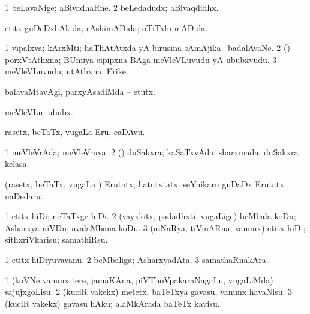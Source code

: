 \bentry
{} 
\gl{\nA}
\expl{}
\bmng
\bnum
\num{1} beLavaNige; aBivadhaRne. 
\num{2} beLedadudx; aBivaqdidhx. 
\enum
\emng
\eentry

\bentry
{} 
\gl{\gu}
\expl{}
\bmng
etitx guDeDxhAkida; rAshimADida; oTiTxlu mADida. 
\emng
\eentry

\bentry
{} 
\gl{\nA}
\expl{}
\bmng
\bnum
\num{1} vipalxva; kArxMti; haThAtAtxda yA birusina sAmAjika \mo\ badalAvaNe. 
\num{2} (\BUvi) porxVtAthxna; BUmiya cipipxna BAga meVleVLuvudu yA ububxvudu. 
\num{3} meVleVLuvudu; utAthxna; Erike. 
\enum
\emng
\eentry

\bentry
{} 
\gl{\akirx}
\expl{}
\bmng
balavaMtavAgi, parxyAsadiMda -- etutx. 
\emng

\noindent
\gl{\akirx}
\expl{}
\bmng
meVleVLu; ububx. 
\emng
\eentry

\bentry
{} 
\gl{\nA}
\expl{}
\bmng
rasetx, beTaTx, \mo vugaLa Eru, caDAvu. 
\emng
\eentry

\bentry
{} 
\gl{\gu}
\expl{}
\bmng
\bnum
\num{1} meVleVrAda; meVleVruva. 
\num{2} (\rUpa) duSakxra; kaSaTxvAda; sharxmada:  duSakxra kelasa. 
\enum
\emng
\eentry

\bentry
{} 
\gl{\kirxvi}
\expl{}
\bmng
(rasetx, beTaTx, \mo vugaLa \vi) Erutatx; hatutxtatx:  seYnikaru guDaDx Erutatx naDedaru. 
\emng
\eentry

\bentry
{} 
\gl{\sakirx}
\bmng
\bnum
\num{1} etitx hiDi; neTaTxge hiDi. 
\num{2} (vayxkitx, padadhxti, \mo vugaLige) beMbala koDu; Asharxya niVDu; avalaMbana koDu. 
\num{3} (niNaRya, tiVmARna, \mo vanunx) etitx hiDi; sithxriVkarisu; samathiRsu. 
\enum
\emng
\eentry

\bentry
{} 
\gl{\nA}
\expl{}
\bmng
\bnum
\num{1} etitx hiDiyuvavanu. 
\num{2} beMbaliga; AsharxyadAta. 
\num{3} samathaRnakAra. 
\enum
\emng
\eentry

\bentry
{} 
\gl{\sakirx}
\expl{}
\bmng
\bnum
\num{1} (koVNe \mo vanunx tere, jamaKAna, piVThoVpakaraNagaLu, \mo vugaLiMda) sajujxgoLisu. 
\num{2} (kuciR \mo vakekx) metetx, baTeTxya gavasu, \mo vanunx havaNisu. 
\num{3} (kuciR \mo vakekx) gavasu hAku; alaMkArada baTeTx kavisu. 
\enum
\emng

